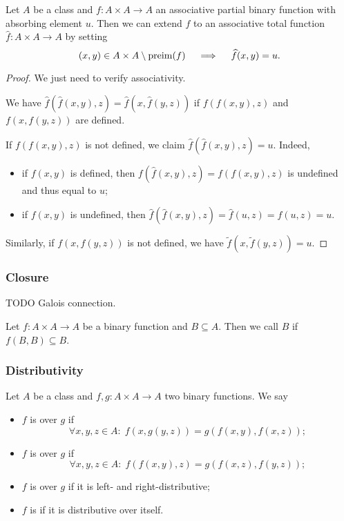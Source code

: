 \begin{lemma}
Let $A$ be a class and $f: A\times A \to A$ an associative partial binary function with absorbing element $u$. Then we can extend $f$ to an associative total function $\widehat{f}: A \times A \to A$
by setting
\[ (x,y) \in A\times A \setminus \operatorname{preim}(f) \quad\implies\quad \widehat{f}(x,y) = u. \]
\end{lemma}
\begin{proof}
We just need to verify associativity.

We have $\widehat{f}(\widehat{f}(x,y),z) = \widehat{f}(x,\widehat{f}(y,z))$ if $f(f(x,y),z)$ and $f(x,f(y,z))$ are defined.

If $f(f(x,y),z)$ is not defined, we claim $\widehat{f}(\widehat{f}(x,y),z) = u$. Indeed,
\begin{itemize}
\item if $f(x,y)$ is defined, then $f(\widehat{f}(x,y),z) = f(f(x,y),z)$ is undefined and thus equal to $u$;
\item if $f(x,y)$ is undefined, then $\widehat{f}(\widehat{f}(x,y),z) = \widehat{f}(u,z) = f(u,z) = u$.
\end{itemize}

Similarly, if $f(x, f(y, z))$ is not defined, we have $\widetilde{f}(x, \widetilde{f}(y, z)) = u$.
\end{proof}

\subsubsection{Closure}
TODO Galois connection.
\begin{definition}
Let $f:A\times A\to A$ be a binary function and $B\subseteq A$. Then we call $B$  if $f(B,B) \subseteq B$.
\end{definition}

\subsubsection{Distributivity}
\begin{definition}
Let $A$ be a class and $f,g: A\times A \to A$ two binary functions. We say
\begin{itemize}
\item $f$ is  over $g$ if
\[ \forall x,y,z\in A: \; f(x,g(y,z)) = g(f(x,y),f(x,z)); \]
\item $f$ is  over $g$ if
\[ \forall x,y,z\in A: \; f(f(x,y), z) = g(f(x,z),f(y,z)); \]
\item $f$ is  over $g$ if it is left- and right-distributive;
\item $f$ is  if it is distributive over itself.
\end{itemize}
\end{definition}

